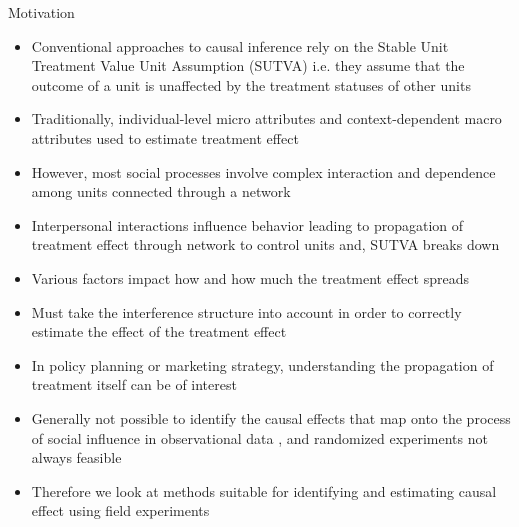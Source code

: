 \documentclass[final]{beamer}
\newlength{\onecolwid}
\newlength{\onecolwidd}
\begin{document}
\begin{frame}[t]
\begin{columns}[t]
\begin{column}{\onecolwidd}
\begin{block}{Motivation}
\begin{rmfamily}
\begin{itemize}
	\item Conventional approaches to causal inference rely on the Stable Unit Treatment Value Unit Assumption (SUTVA) i.e. they assume that the outcome of a unit is unaffected by the treatment statuses of other units
	\vspace*{.1in}
	\item Traditionally, individual-level micro attributes and context-dependent macro attributes used to estimate treatment effect
	\vspace*{.1in}
	\item However, most social processes involve complex interaction and dependence among units connected through a network
	\vspace*{.1in}
	\item Interpersonal interactions influence behavior leading to propagation of treatment effect through network to control units and, SUTVA breaks down
	\vspace*{.1in}
	\item Various factors impact how and how much the treatment effect spreads
	\vspace*{.1in}
	\item Must take the interference structure into account in order to correctly estimate the effect of the treatment effect
	\vspace*{.1in}
	\item In policy planning or marketing strategy, understanding the propagation of treatment itself can be of interest
	\vspace*{.1in}
	\item Generally not possible to identify the causal effects that map onto the process of social influence in observational data \citep{shalizi2011homophily}, and randomized experiments not always feasible
	\vspace*{.1in}
	\item Therefore we look at methods suitable for identifying and estimating causal effect using field experiments
	
	\end{itemize}
	\end{rmfamily}


\end{block}
\end{column}
\end{columns}
\end{frame}
\end{document}
